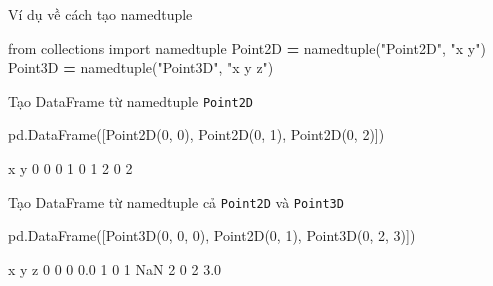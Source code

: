 \documentclass[
]{book}
\newenvironment{Shaded}{\begin{snugshade}}{\end{snugshade}}
\newcommand{\DecValTok}[1]{\textcolor[rgb]{0.00,0.00,0.81}{#1}}
\newcommand{\ImportTok}[1]{#1}
\newcommand{\NormalTok}[1]{#1}
\newcommand{\OperatorTok}[1]{\textcolor[rgb]{0.81,0.36,0.00}{\textbf{#1}}}
\newcommand{\StringTok}[1]{\textcolor[rgb]{0.31,0.60,0.02}{#1}}
\begin{document}
Ví dụ về cách tạo namedtuple

\begin{Shaded}
\begin{Highlighting}[]
\ImportTok{from}\NormalTok{ collections }\ImportTok{import}\NormalTok{ namedtuple}
\NormalTok{Point2D }\OperatorTok{=}\NormalTok{ namedtuple(}\StringTok{"Point2D"}\NormalTok{, }\StringTok{"x y"}\NormalTok{)}
\NormalTok{Point3D }\OperatorTok{=}\NormalTok{ namedtuple(}\StringTok{"Point3D"}\NormalTok{, }\StringTok{"x y z"}\NormalTok{)}
\end{Highlighting}
\end{Shaded}

Tạo DataFrame từ namedtuple \texttt{Point2D}

\begin{Shaded}
\begin{Highlighting}[]
\NormalTok{pd.DataFrame([Point2D(}\DecValTok{0}\NormalTok{, }\DecValTok{0}\NormalTok{), Point2D(}\DecValTok{0}\NormalTok{, }\DecValTok{1}\NormalTok{), Point2D(}\DecValTok{0}\NormalTok{, }\DecValTok{2}\NormalTok{)])}
\end{Highlighting}
\end{Shaded}

\begin{Shaded}
\begin{Highlighting}[]
\NormalTok{   x  y}
\NormalTok{0  0  0}
\NormalTok{1  0  1}
\NormalTok{2  0  2}
\end{Highlighting}
\end{Shaded}

Tạo DataFrame từ namedtuple cả \texttt{Point2D} và \texttt{Point3D}

\begin{Shaded}
\begin{Highlighting}[]
\NormalTok{pd.DataFrame([Point3D(}\DecValTok{0}\NormalTok{, }\DecValTok{0}\NormalTok{, }\DecValTok{0}\NormalTok{), Point2D(}\DecValTok{0}\NormalTok{, }\DecValTok{1}\NormalTok{), Point3D(}\DecValTok{0}\NormalTok{, }\DecValTok{2}\NormalTok{, }\DecValTok{3}\NormalTok{)])}
\end{Highlighting}
\end{Shaded}

\begin{Shaded}
\begin{Highlighting}[]
\NormalTok{   x  y    z}
\NormalTok{0  0  0  0.0}
\NormalTok{1  0  1  NaN}
\NormalTok{2  0  2  3.0}
\end{Highlighting}
\end{Shaded}
\end{document}
